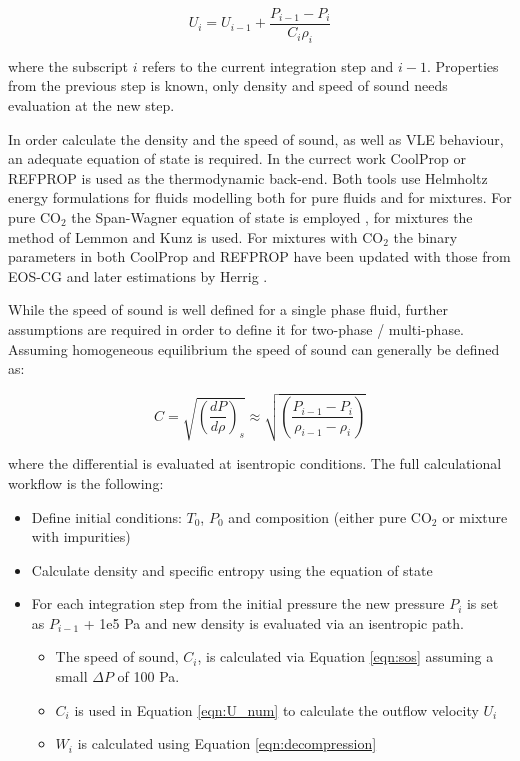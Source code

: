 \documentclass[a4paper, 10pt, twocolumn, twoside]{scrartcl}
\begin{document}
\begin{equation}\label{eqn:U_num}
U_i = U_{i-1} + \frac{P_{i-1}-P_i}{C_i \rho_i}
\end{equation}

where the subscript $i$ refers to the current integration step and $i-1$. Properties from the previous step is known, only density and speed of sound needs evaluation at the new step. 

In order calculate the density and the speed of sound, as well as VLE behaviour,  an adequate equation of state is required. In the currect work CoolProp \cite{coolprop} or REFPROP \cite{REFPROP} is used as the thermodynamic back-end. Both tools use Helmholtz energy formulations for fluids modelling both for pure fluids and for mixtures. For pure CO$_2$ the Span-Wagner equation of state is employed \cite{Span2009}, for mixtures the method of Lemmon \cite{Lemmon1999} and Kunz \cite{Kunz2012} is used. For mixtures with CO$_2$ the binary parameters in both CoolProp and REFPROP have been updated with those from EOS-CG \cite{Gernert2016} and later estimations by Herrig \cite{Herrig2018}. 

While the speed of sound is well defined for a single phase fluid, further assumptions are required in order to define it for two-phase / multi-phase. Assuming homogeneous equilibrium the speed of sound can generally be defined as:

\begin{equation}\label{eqn:sos}
C = \sqrt{\left( \frac{dP}{d\rho}\right)_s} \approx \sqrt{\left( \frac{P_{i-1} - P_i}{\rho_{i-1}-\rho_i}\right)}
\end{equation}

where the differential is evaluated at isentropic conditions. The full calculational workflow is the following:

\begin{itemize}
	\item Define initial conditions: $T_0$, $P_0$ and composition (either pure CO$_2$ or mixture with impurities)
	\item Calculate density and specific entropy using the equation of state
	\item For each integration step from the initial pressure the new pressure $P_i$ is set as $P_{i-1}$ + 1e5 Pa and new density is evaluated via an isentropic path.
	\begin{itemize}
		\item The speed of sound, $C_i$, is calculated via Equation \ref{eqn:sos} assuming a small $\Delta P$ of 100 Pa. 
		\item $C_i$ is used in Equation \ref{eqn:U_num} to calculate the outflow velocity $U_i$
		\item $W_i$ is calculated using Equation \ref{eqn:decompression}
	\end{itemize}
\end{itemize}
\end{document}
